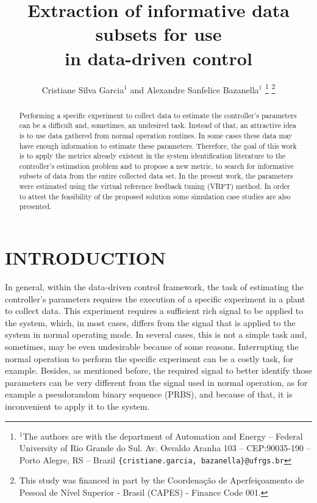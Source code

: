 \documentclass[letterpaper, 10 pt, conference]{ieeeconf}  %
\title{\LARGE \bf
Extraction of informative data subsets for use \\ in data-driven control
}
\author{Cristiane Silva Garcia$^{1}$ and Alexandre Sanfelice Bazanella$^{1}$%
\thanks{$^{1}$The authors are with the department of Automation and Energy -- Federal University of Rio Grande do Sul. Av. Osvaldo Aranha 103 -- CEP:90035-190 -- Porto Alegre, RS -- Brazil
        {\tt\small \{cristiane.garcia, bazanella\}@ufrgs.br}}%
\thanks{This study was financed in part by the Coordena\c{c}\~{a}o de Aperfei\c{c}oamento de Pessoal de N\'{i}vel Superior - Brasil (CAPES) - Finance Code 001.}
}
\begin{document}


\maketitle
\thispagestyle{empty}
\pagestyle{empty}


\begin{abstract}


Performing a specific experiment to collect data to estimate the controller's parameters can be a difficult and, sometimes, an undesired task.
Instead of that, an attractive idea is to use data gathered from normal operation routines.
In some cases these data may have enough information to estimate these parameters.
Therefore, the goal of this work is to apply the metrics already existent in the system identification literature to the controller's estimation problem and to propose a new metric, to search for informative subsets of data from the entire collected data set.
In the present work, the parameters were estimated using the virtual reference feedback tuning (VRFT) method.
In order to attest the feasibility of the proposed solution some simulation case studies are also presented.


\end{abstract}

\section{INTRODUCTION}


In general, within the data-driven control framework, the task of estimating the controller's parameters requires the execution of a specific experiment in a plant to collect data.
This experiment requires a sufficient rich signal to be applied to the system, which, in most cases, differs from the signal that is applied to the system in normal operating mode.
In several cases, this is not a simple task and, sometimes, may be even undesirable because of some reasons.
Interrupting the normal operation to perform the specific experiment can be a costly task, for example.
Besides, as mentioned before, the required signal to better identify those parameters can be very different from the signal used in normal operation, as for example a pseudorandom binary sequence (PRBS), and because of that, it is inconvenient to apply it to the system.
\end{document}
